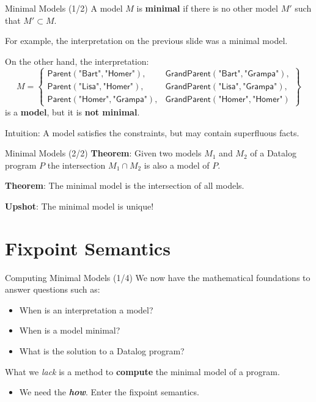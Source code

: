 \begin{frame}{Minimal Models (1/2)}
A model $M$ is \textbf{minimal} if there is no other model $M'$ such that $M'
\subset M$.

\pause

For example, the interpretation on the previous slide was a minimal model.

\pause

On the other hand, the interpretation:
$$
M = \left\{
\begin{array}{ll}
\textsf{Parent}(\textsf{"Bart"}, \textsf{"Homer"}),     & \textsf{GrandParent}(\textsf{"Bart"}, \textsf{"Grampa"}), \\
\textsf{Parent}(\textsf{"Lisa"}, \textsf{"Homer"}),     & \textsf{GrandParent}(\textsf{"Lisa"}, \textsf{"Grampa"}), \\
\textsf{Parent}(\textsf{"Homer"}, \textsf{"Grampa"}),   & \textsf{GrandParent}(\textsf{"Homer"}, \textsf{"Homer"})
\end{array}\right\}
$$
is a \textbf{model}, but it is \textbf{not minimal}.

\pause

Intuition: A model satisfies the constraints, but may contain superfluous facts.
\end{frame}

\begin{frame}{Minimal Models (2/2)}
\textbf{Theorem}: Given two models $M_1$ and $M_2$ of a Datalog program $P$ the
intersection $M_1 \cap M_2$ is also a model of $P$. 

\textbf{Theorem}: The minimal model is the intersection of all models.

\textbf{Upshot}: The minimal model is unique!
\end{frame}

\section{Fixpoint Semantics}

\begin{frame}{Computing Minimal Models (1/4)}
We now have the mathematical foundations to answer questions such as:
\begin{itemize}
\item When is an interpretation a model?
\item When is a model minimal?
\item What is the solution to a Datalog program?
\end{itemize}

\pause

What we \emph{lack} is a method to \textbf{compute} the minimal model of a program.
\begin{itemize}
    \item We need the \textbf{\emph{how}}. Enter the fixpoint semantics.
\end{itemize}
\end{frame}

